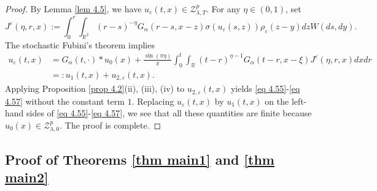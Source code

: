 \documentclass[11pt,reqno]{amsart}
\numberwithin{equation}{section}
\newcommand{\1}{{\bf 1}}
\newcommand{\2}{{\bf 2}}
\begin{document}
\begin{proof}
By Lemma \ref{lem 4.5}, we have $u_{\varepsilon}(t,x)\in \mathcal{Z}_{\lambda,T}^p$.  For any $\eta\in(0,1)$,   set
  \begin{equation*}
J^{\varepsilon}(\eta,r,x):=\int_0^{r}\int_{\mathbb{R}^2}(r-s)^{-\eta}G_{\alpha}(r-s,x-z)\sigma(u_{\varepsilon}(s,z))\rho_{\varepsilon}(z-y)dzW(ds,dy).
\end{equation*}
The stochastic Fubini's theorem   implies
\begin{align*}
u_{\varepsilon}(t,x)&=G_{\alpha}(t,\cdot)*u_0(x)+\frac{\sin(\pi \eta)}{\pi}\int_0^{t}\int_{\mathbb{R}}(t-r)^{\eta-1}G_{\alpha}(t-r,x-\xi)J^{\varepsilon}(\eta,r, x)dx dr\\
&=:u_1(t,x)+u_{2,\varepsilon}(t,x).
\end{align*}
Applying Proposition \ref{prop 4.2}(ii), (iii), (iv) to $u_{2,\varepsilon}(t,x)$ yields \eqref{eq 4.55}-\eqref{eq 4.57} without the constant term $1$. Replacing $u_{\varepsilon}(t,x)$ by $u_1(t,x)$ on the left-hand sides of \eqref{eq 4.55}-\eqref{eq 4.57}, we see that all these quantities   are  finite because  $u_0(x)\in \mathcal{Z}_{\lambda,0}^p$.  
The proof is complete.
\end{proof}

 
 
 
  \subsection{Proof of Theorems \ref{thm main1} and  \ref{thm main2}}
 
\end{document}
